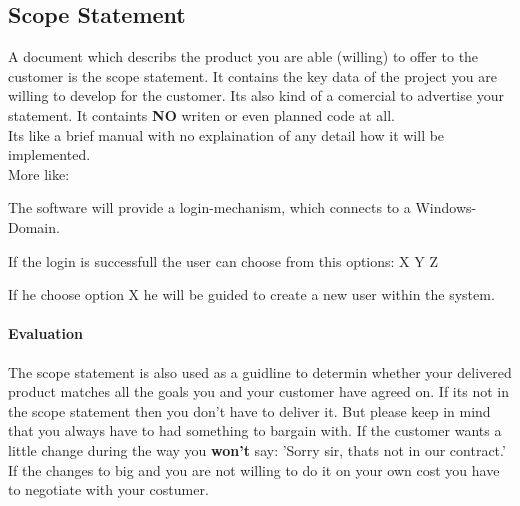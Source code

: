 \documentclass[11pt]{article}
\begin{document}
\subsection{Scope Statement}
A document which describs the product you are able (willing) to offer to the customer is the scope statement.
It contains the key data of the project you are willing to develop for the customer.
Its also kind of a comercial to advertise your statement. It containts \textbf{NO} writen or even planned code at all. \\
Its like a brief manual with no explaination of any detail how it will be implemented. \\
More like: \\
{\colorbox{lGray}{The software will provide a login-mechanism, which connects to a Windows-Domain.} \\
{\colorbox{lGray}{If the login is successfull the user can choose from this options: X Y Z}\\
{\colorbox{lGray}{If he choose option X he will be guided to create a new user within the system.}

\paragraph{Evaluation} The scope statement is also used as a guidline to determin whether your delivered product matches all the goals you and your customer have agreed on.
If its not in the scope statement then you don't have to deliver it. But please keep in mind that you always have to had something to bargain with.
If the customer wants a little change during the way you \textbf{won't} say: 'Sorry sir, thats not in our contract.' \\
If the changes to big and you are not willing to do it on your own cost you have to negotiate with your costumer.

}}}
\end{document}
